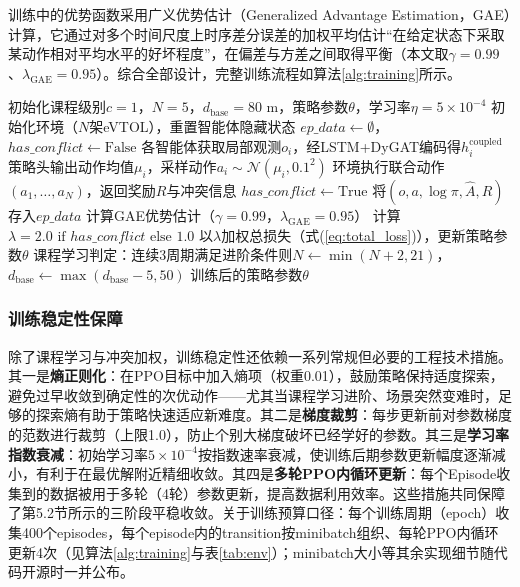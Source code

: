 \documentclass[12pt,a4paper,UTF8]{ctexart}
\begin{document}
训练中的优势函数采用广义优势估计（Generalized Advantage Estimation，GAE）\cite{ref38}计算，它通过对多个时间尺度上时序差分误差的加权平均估计“在给定状态下采取某动作相对平均水平的好坏程度”，在偏差与方差之间取得平衡（本文取$\gamma=0.99$、$\lambda_{\text{GAE}}=0.95$）。综合全部设计，完整训练流程如算法\ref{alg:training}所示。

\begin{algorithm}[H]
\caption{基于DyGAT-MARL的协同管控模型训练流程}
\label{alg:training}
\begin{algorithmic}[1]
\STATE 初始化课程级别$c=1$，$N=5$，$d_{\text{base}}=80$ m，策略参数$\theta$，学习率$\eta=5\times10^{-4}$
    \STATE 初始化环境（$N$架eVTOL），重置智能体隐藏状态
    \STATE $ep\_data \leftarrow \emptyset$，$has\_conflict \leftarrow \text{False}$
    \REPEAT
        \STATE 各智能体获取局部观测$o_i$，经LSTM+DyGAT编码得$h_i^{\text{coupled}}$
        \STATE 策略头输出动作均值$\mu_i$，采样动作$a_i\sim\mathcal{N}(\mu_i,0.1^2)$
        \STATE 环境执行联合动作$(a_1,\ldots,a_N)$，返回奖励$R$与冲突信息
         \STATE $has\_conflict \leftarrow \text{True}$ \ENDIF
        \STATE 将$(o,a,\log\pi,\hat{A},R)$存入$ep\_data$
    \STATE 计算GAE\cite{ref38}优势估计（$\gamma=0.99$，$\lambda_{\text{GAE}}=0.95$）
    \STATE 计算$\lambda = 2.0 \text{ if } has\_conflict \text{ else } 1.0$
    \STATE 以$\lambda$加权总损失（式(\ref{eq:total_loss})），更新策略参数$\theta$
    \STATE 课程学习判定：连续3周期满足进阶条件则$N\leftarrow\min(N+2,21)$，$d_{\text{base}}\leftarrow\max(d_{\text{base}}-5,50)$
\ENDFOR
\STATE \RETURN 训练后的策略参数$\theta$
\end{algorithmic}
\end{algorithm}

\subsubsection{训练稳定性保障}

除了课程学习与冲突加权，训练稳定性还依赖一系列常规但必要的工程技术措施。其一是\textbf{熵正则化}：在PPO目标中加入熵项（权重0.01），鼓励策略保持适度探索，避免过早收敛到确定性的次优动作——尤其当课程学习进阶、场景突然变难时，足够的探索熵有助于策略快速适应新难度。其二是\textbf{梯度裁剪}：每步更新前对参数梯度的范数进行裁剪（上限1.0），防止个别大梯度破坏已经学好的参数。其三是\textbf{学习率指数衰减}：初始学习率$5\times10^{-4}$按指数速率衰减，使训练后期参数更新幅度逐渐减小，有利于在最优解附近精细收敛。其四是\textbf{多轮PPO内循环更新}：每个Episode收集到的数据被用于多轮（4轮）参数更新，提高数据利用效率。这些措施共同保障了第5.2节所示的三阶段平稳收敛。关于训练预算口径：每个训练周期（epoch）收集400个episodes，每个episode内的transition按minibatch组织、每轮PPO内循环更新4次（见算法\ref{alg:training}与表\ref{tab:env}）；minibatch大小等其余实现细节随代码开源时一并公布。
\end{document}
